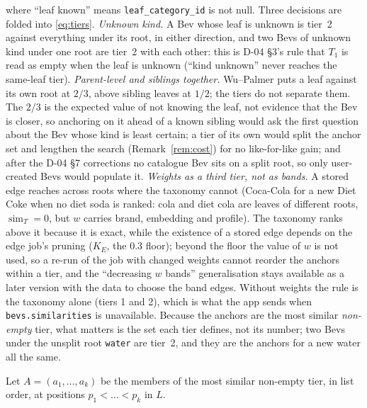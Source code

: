 \documentclass[11pt]{article}
\DeclareMathOperator{\simi}{sim}
\newcommand{\code}[1]{\texttt{#1}}
\theoremstyle{plain}
\theoremstyle{definition}
\theoremstyle{remark}
\begin{document}
where ``leaf known'' means \code{leaf\_category\_id} is not null. Three decisions are folded into \eqref{eq:tiers}. \emph{Unknown kind.} A Bev whose leaf is unknown is tier~2 against everything under its root, in either direction, and two Bevs of unknown kind under one root are tier~2 with each other: this is D-04 \S 3's rule that $T_1$ is read as empty when the leaf is unknown (``kind unknown'' never reaches the same-leaf tier). \emph{Parent-level and siblings together.} Wu--Palmer puts a leaf against its own root at $2/3$, above sibling leaves at $1/2$; the tiers do not separate them. The $2/3$ is the expected value of not knowing the leaf, not evidence that the Bev is closer, so anchoring on it ahead of a known sibling would ask the first question about the Bev whose kind is least certain; a tier of its own would split the anchor set and lengthen the search (Remark~\ref{rem:cost}) for no like-for-like gain; and after the D-04 \S 7 corrections no catalogue Bev sits on a split root, so only user-created Bevs would populate it. \emph{Weights as a third tier, not as bands.} A stored edge reaches across roots where the taxonomy cannot (Coca-Cola for a new Diet Coke when no diet soda is ranked: cola and diet cola are leaves of different roots, $\simi_T = 0$, but $w$ carries brand, embedding and profile). The taxonomy ranks above it because it is exact, while the existence of a stored edge depends on the edge job's pruning ($K_E$, the $0.3$ floor); beyond the floor the value of $w$ is not used, so a re-run of the job with changed weights cannot reorder the anchors within a tier, and the ``decreasing $w$ bands'' generalisation stays available as a later version with the data to choose the band edges. Without weights the rule is the taxonomy alone (tiers 1 and 2), which is what the app sends when \code{bevs.similarities} is unavailable. Because the anchors are the most similar \emph{non-empty} tier, what matters is the set each tier defines, not its number; two Bevs under the unsplit root \code{water} are tier~2, and they are the anchors for a new water all the same.

Let $A = (a_1, \dots, a_k)$ be the members of the most similar non-empty tier, in list order, at positions $p_1 < \dots < p_k$ in $L$.
\end{document}
